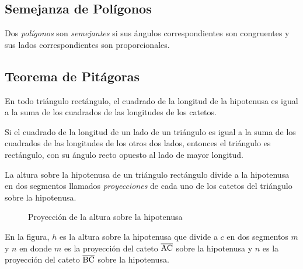 \subsection{Semejanza de Polígonos}

\begin{definition}
    Dos \textit{polígonos} son \textit{semejantes} si sus ángulos correspondientes son congruentes y sus lados correspondientes son proporcionales.
\end{definition}


\subsection{Teorema de Pitágoras}

\begin{theorem}
    En todo triángulo rectángulo, el cuadrado de la longitud de la hipotenusa es igual a la suma de los cuadrados de las longitudes de los catetos.
\end{theorem}

\begin{theorem}
    Si el cuadrado de la longitud de un lado de un triángulo es igual a la suma de los cuadrados de las longitudes de los otros dos lados, entonces el triángulo es rectángulo, con su ángulo recto opuesto al lado de mayor longitud.
\end{theorem}

\begin{definition}

    La altura sobre la hipotenusa de un triángulo rectángulo divide a la hipotenusa en dos segmentos llamados \textit{proyecciones} de cada uno de los catetos del triángulo sobre la hipotenusa.

    \begin{figure}[!h]
        \centering
        
        \caption{Proyección de la altura sobre la hipotenusa}
        \label{fig:projection-hypothenuse}
    \end{figure}    

    En la figura, $h$ es la altura sobre la hipotenusa que divide a $c$ en dos segmentos $m$ y $n$ en donde $m$ es la proyección del cateto $\overline{\rm AC}$ sobre la hipotenusa y $n$ es la proyección del cateto $\overline{\rm BC}$ sobre la hipotenusa.
\end{definition}

